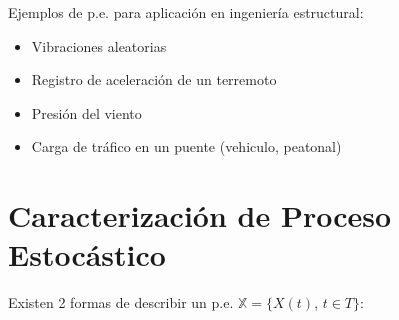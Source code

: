 \par Ejemplos de p.e. para aplicación en ingeniería estructural:

\begin{itemize}
    \item Vibraciones aleatorias
    \item Registro de aceleración de un terremoto
    \item Presión del viento
    \item Carga de tráfico en un puente (vehiculo, peatonal)
\end{itemize}

\section{Caracterización de Proceso Estocástico}

\par Existen 2 formas de describir un p.e. $\mathbb{X} = \{X(t)$, $t\in T\}$:

